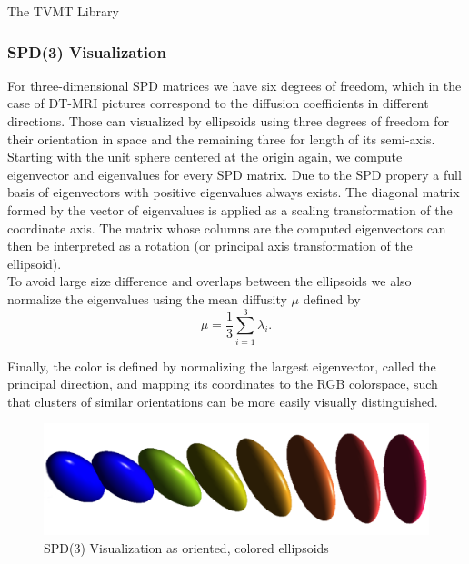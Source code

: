 \begin{chapter}{The TVMT Library}
\subsubsection{SPD(3) Visualization} %
\label{ssub:SPD(3) Visualization}
For three-dimensional SPD matrices we have six degrees of freedom, which in the case of DT-MRI pictures correspond to the diffusion coefficients in different directions.
Those can visualized by ellipsoids using three degrees of freedom for their orientation in space and the remaining three for length of its semi-axis.\\
Starting with the unit sphere centered at the origin again, we compute eigenvector and eigenvalues for every SPD matrix. Due to the SPD propery a full basis of eigenvectors
with positive eigenvalues always exists. The diagonal matrix formed by the vector of eigenvalues is applied as a scaling transformation of the coordinate axis. The matrix
whose columns are the computed eigenvectors can then be interpreted as a rotation (or principal axis transformation of the ellipsoid).\\
To avoid large size difference and overlaps between the ellipsoids we also normalize the eigenvalues using the mean diffusity $\mu$ defined by
\begin{equation}
    \mu = \frac{1}{3} \sum_{i=1}^{3}\lambda_i.
\end{equation}

Finally, the color is defined by normalizing the largest eigenvector, called the principal direction, and mapping its coordinates to the RGB colorspace, such that clusters of
similar orientations can be more easily visually distinguished.

\begin{figure}[h!]
        \centering
	    \includegraphics[width=0.8\linewidth]{./figures/library/ellipsoids.pdf}
	    \caption[SPD(3) ellipsoid visualization]{SPD(3) Visualization as oriented, colored ellipsoids}
	\label{fig:ellipsoid_visualization}
\end{figure}


\end{chapter}
